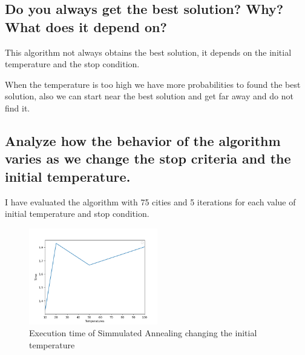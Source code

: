 \documentclass{article}
\begin{document}
        \newpage

        \subsection{Do you always get the best solution? Why? What does it depend on?}

            This algorithm not always obtains the best solution, it depends on the initial temperature and the stop condition.

            
        When the temperature is too high we have more probabilities to found the best solution, also we can start near the best solution and get
        far away and do not find it.

        \subsection{Analyze how the behavior of the algorithm varies as we change the stop criteria
    and the initial temperature.}

            I have evaluated the algorithm with 75 cities and 5 iterations for each value of initial temperature and stop condition.

            \begin{figure}[H]

                \centering
                \includegraphics[width=0.5\textwidth]{../media/03.SimAnnealing-Initial-Ta-time-75cities.png}
                \caption{Execution time of Simmulated Annealing changing the initial temperature}
                \label{Execution time of Simmulated Annealing changing the initial temperature}
    
            \end{figure}
\end{document}
